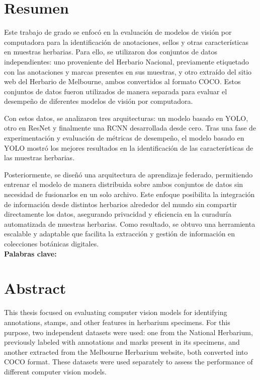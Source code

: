 \newpage
\thispagestyle{empty}
\chapter*{\sffamily Resumen}
%
\begin{center}
\textbf{\large \thesisname}
\end{center}
\par Este trabajo de grado se enfocó en la evaluación de modelos de visión por computadora para la identificación de anotaciones, sellos y otras características en muestras herbarias. Para ello, se utilizaron dos conjuntos de datos independientes: uno proveniente del Herbario Nacional, previamente etiquetado con las anotaciones y marcas presentes en sus muestras, y otro extraído del sitio web del Herbario de Melbourne, ambos convertidos al formato COCO. Estos conjuntos de datos fueron utilizados de manera separada para evaluar el desempeño de diferentes modelos de visión por computadora.

Con estos datos, se analizaron tres arquitecturas: un modelo basado en YOLO, otro en ResNet y finalmente una RCNN desarrollada desde cero. Tras una fase de experimentación y evaluación de métricas de desempeño, el modelo basado en YOLO mostró los mejores resultados en la identificación de las características de las muestras herbarias.

Posteriormente, se diseñó una arquitectura de aprendizaje federado, permitiendo entrenar el modelo de manera distribuida sobre ambos conjuntos de datos sin necesidad de fusionarlos en un solo archivo. Este enfoque posibilita la integración de información desde distintos herbarios alrededor del mundo sin compartir directamente los datos, asegurando privacidad y eficiencia en la curaduría automatizada de muestras herbarias. Como resultado, se obtuvo una herramienta escalable y adaptable que facilita la extracción y gestión de información en colecciones botánicas digitales.
\\[2cm]
\textbf{Palabras clave:} \palabrasclave

\newpage
\thispagestyle{empty}
\chapter*{\sffamily Abstract}
%
\begin{center}
\textbf{\large \thesisnameeng}
\end{center}
\par This thesis focused on evaluating computer vision models for identifying annotations, stamps, and other features in herbarium specimens. For this purpose, two independent datasets were used: one from the National Herbarium, previously labeled with annotations and marks present in its specimens, and another extracted from the Melbourne Herbarium website, both converted into COCO format. These datasets were used separately to assess the performance of different computer vision models.

